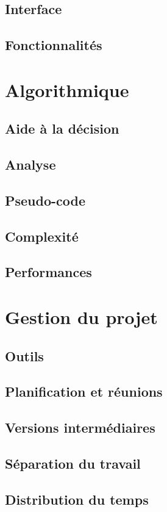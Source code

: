 \documentclass[a4paper,11pt]{article}
\begin{document}
  \subsection{Interface}
  \subsection{Fonctionnalités}
\section{Algorithmique}
  \subsection{Aide à la décision}
  \subsection{Analyse} 
  \subsection{Pseudo-code}
  \subsection{Complexité}
  \subsection{Performances}
\section{Gestion du projet}
  \subsection{Outils}
  \subsection{Planification et réunions}
  \subsection{Versions intermédiaires}
  \subsection{Séparation du travail}
  \subsection{Distribution du temps}
\end{document}

